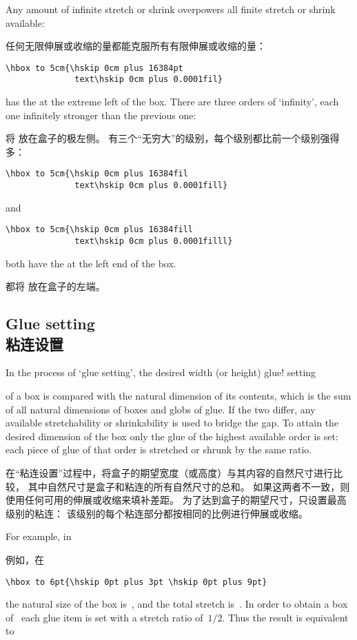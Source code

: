 Any amount of infinite stretch or shrink overpowers all
finite stretch or shrink available:

任何无限伸展或收缩的量都能克服所有有限伸展或收缩的量：
\begin{verbatim}
\hbox to 5cm{\hskip 0cm plus 16384pt 
              text\hskip 0cm plus 0.0001fil}
\end{verbatim}
has the  at the extreme left of the box.
There are three orders of `infinity', each  one infinitely
stronger than the previous one:

将  放在盒子的极左侧。
有三个“无穷大”的级别，每个级别都比前一个级别强得多：
\begin{verbatim}
\hbox to 5cm{\hskip 0cm plus 16384fil
              text\hskip 0cm plus 0.0001fill}
\end{verbatim}
and
\begin{verbatim}
\hbox to 5cm{\hskip 0cm plus 16384fill
              text\hskip 0cm plus 0.0001filll}
\end{verbatim}
both have the  at the left end of the box.

都将  放在盒子的左端。 


\subsection{Glue setting\\粘连设置}

In the process of `glue setting', the desired width (or height)
\term glue! setting\par
of a box is compared with the natural dimension of its contents,
which is the sum of all natural dimensions of boxes and globs of glue.
If the two differ, any available stretchability or shrinkability is used
to bridge the gap.
To attain the desired dimension of the box
only the glue of the highest available order is set:
each piece of glue of that order is stretched or shrunk by the
same ratio.

在“粘连设置”过程中，将盒子的期望宽度（或高度）与其内容的自然尺寸进行比较，
其中自然尺寸是盒子和粘连的所有自然尺寸的总和。
如果这两者不一致，则使用任何可用的伸展或收缩来填补差距。
为了达到盒子的期望尺寸，只设置最高级别的粘连：
该级别的每个粘连部分都按相同的比例进行伸展或收缩。

For example, in

例如，在
\begin{verbatim}
\hbox to 6pt{\hskip 0pt plus 3pt \hskip 0pt plus 9pt}
\end{verbatim}
the natural size of the box is~\n{0pt}, and
the total stretch is~\n{12pt}. In order to obtain a box
of~\n{6pt} each glue item is set with a stretch ratio
of~$1/2$. Thus the result is equivalent to

